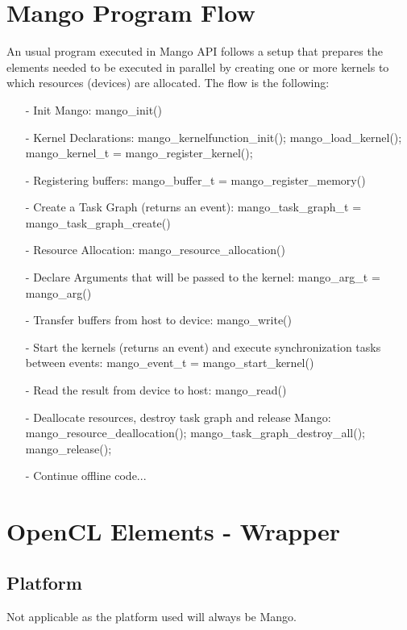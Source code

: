 \documentclass[a4paper]{article}
\begin{document}
\section{Mango Program Flow}
An usual program executed in Mango API follows a setup that prepares the elements needed to be executed in parallel by creating one or more kernels to which resources (devices) are allocated.
The flow is the following:
\begin{itemize}
	\item[-] Init Mango: \ttfamily mango\_init() \rmfamily
        	\item[-] Kernel Declarations: \ttfamily mango\_kernelfunction\_init(); mango\_load\_kernel(); mango\_kernel\_t = mango\_register\_kernel();  \rmfamily
	\item[-] Registering buffers: \ttfamily mango\_buffer\_t = mango\_register\_memory() \rmfamily
	\item[-] Create a Task Graph (returns an event):  \ttfamily mango\_task\_graph\_t = mango\_task\_graph\_create() \rmfamily
	\item[-] Resource Allocation: \ttfamily mango\_resource\_allocation() \rmfamily
	\item[-] Declare Arguments that will be passed to the kernel: \ttfamily mango\_arg\_t = mango\_arg() \rmfamily
	\item[-] Transfer buffers from host to device: \ttfamily mango\_write() \rmfamily
	\item[-] Start the kernels (returns an event) and execute synchronization tasks between events: \ttfamily mango\_event\_t = mango\_start\_kernel() \rmfamily
	\item[-] Read the result from device to host: \ttfamily mango\_read() \rmfamily
	\item[-] Deallocate resources, destroy task graph and release Mango: \ttfamily mango\_resource\_deallocation(); mango\_task\_graph\_destroy\_all(); mango\_release(); \rmfamily
	\item[-] Continue offline code... 
\end{itemize} 

\section{OpenCL Elements - Wrapper}
\subsection{Platform}
Not applicable as the platform used will always be Mango.
\end{document}

